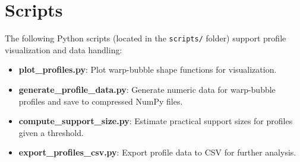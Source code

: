 \documentclass[11pt]{article}
\begin{document}
\section{Scripts}
The following Python scripts (located in the \texttt{scripts/} folder) support profile visualization and data handling:
\begin{itemize}
  \item \textbf{plot\_profiles.py}: Plot warp-bubble shape functions for visualization.
  \item \textbf{generate\_profile\_data.py}: Generate numeric data for warp-bubble profiles and save to compressed NumPy files.
  \item \textbf{compute\_support\_size.py}: Estimate practical support sizes for profiles given a threshold.
  \item \textbf{export\_profiles\_csv.py}: Export profile data to CSV for further analysis.
\end{itemize}

\end{document}
